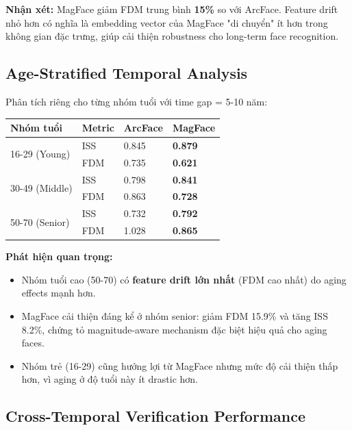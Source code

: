 \textbf{Nhận xét:} MagFace giảm FDM trung bình \textbf{15\%} so với ArcFace. Feature drift nhỏ hơn có nghĩa là embedding vector của MagFace "di chuyển" ít hơn trong không gian đặc trưng, giúp cải thiện robustness cho long-term face recognition.

\subsection{Age-Stratified Temporal Analysis}

Phân tích riêng cho từng nhóm tuổi với time gap = 5-10 năm:

\vspace{0.3cm}
\noindent\begin{tabularx}{\textwidth}{|X|X|X|X|}
\hline
\textbf{Nhóm tuổi} & \textbf{Metric} & \textbf{ArcFace} & \textbf{MagFace} \\
\hline
\multirow{2}{*}{16-29 (Young)} & ISS & 0.845 & \textbf{0.879} \\
\cline{2-4}
 & FDM & 0.735 & \textbf{0.621} \\
\hline
\multirow{2}{*}{30-49 (Middle)} & ISS & 0.798 & \textbf{0.841} \\
\cline{2-4}
 & FDM & 0.863 & \textbf{0.728} \\
\hline
\multirow{2}{*}{50-70 (Senior)} & ISS & 0.732 & \textbf{0.792} \\
\cline{2-4}
 & FDM & 1.028 & \textbf{0.865} \\
\hline
\end{tabularx}
\vspace{0.3cm}

\textbf{Phát hiện quan trọng:}
\begin{itemize}
    \item Nhóm tuổi cao (50-70) có \textbf{feature drift lớn nhất} (FDM cao nhất) do aging effects mạnh hơn.
    \item MagFace cải thiện đáng kể ở nhóm senior: giảm FDM 15.9\% và tăng ISS 8.2\%, chứng tỏ magnitude-aware mechanism đặc biệt hiệu quả cho aging faces.
    \item Nhóm trẻ (16-29) cũng hưởng lợi từ MagFace nhưng mức độ cải thiện thấp hơn, vì aging ở độ tuổi này ít drastic hơn.
\end{itemize}

\subsection{Cross-Temporal Verification Performance}

